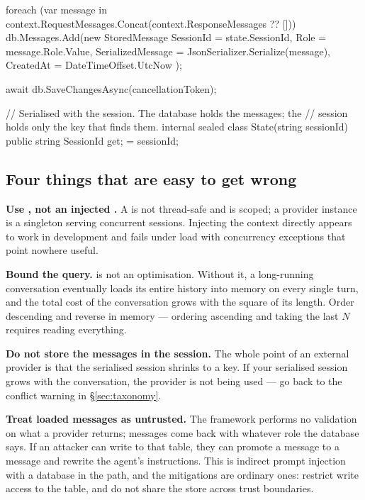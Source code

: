 \begin{csharp}[caption={A ChatHistoryProvider over EF Core}, label={lst:ef-provider}]
{{        foreach (var message in context.RequestMessages.Concat(context.ResponseMessages ?? []))
        {
            db.Messages.Add(new StoredMessage
            {
                SessionId = state.SessionId,
                Role = message.Role.Value,
                SerializedMessage = JsonSerializer.Serialize(message),
                CreatedAt = DateTimeOffset.UtcNow
            });
        }

        await db.SaveChangesAsync(cancellationToken);
    }

    // Serialised with the session. The database holds the messages; the
    // session holds only the key that finds them.
    internal sealed class State(string sessionId)
    {
        public string SessionId { get; } = sessionId;
    }
}
\end{csharp}

\subsection{Four things that are easy to get wrong}
\label{sec:provider-mistakes}

\textbf{Use , not an injected .} A
 is not thread-safe and is scoped; a provider instance is a
singleton serving concurrent sessions. Injecting the context directly appears to
work in development and fails under load with concurrency exceptions that point
nowhere useful.

\textbf{Bound the query.}  is not an optimisation.
Without it, a long-running conversation eventually loads its entire history into
memory on every single turn, and the total cost of the conversation grows with
the square of its length. Order descending and reverse in memory --- ordering
ascending and taking the last $N$ requires reading everything.

\textbf{Do not store the messages in the session.} The whole point of an external
provider is that the serialised session shrinks to a key. If your serialised
session grows with the conversation, the provider is not being used --- go back
to the conflict warning in \S\ref{sec:taxonomy}.

\textbf{Treat loaded messages as untrusted.} The framework performs no validation
on what a provider returns; messages come back with whatever role the database
says. If an attacker can write to that table, they can promote a 
message to a  message and rewrite the agent's instructions. This is
indirect prompt injection with a database in the path, and the mitigations are
ordinary ones: restrict write access to the table, and do not share the store
across trust boundaries.

